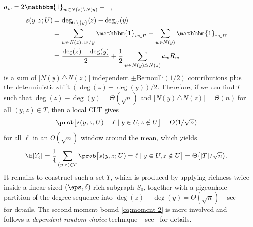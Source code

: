 $a_w = 2\mathbbm{1}_{w \in N(z) \setminus N(y)} - 1$,
\begin{align*}
  s(y, z; U)
  &= \deg_{U \setminus \{y\}}(z) - \deg_{U}(y) \\
  &= \sum_{w \in N(z),\, w \neq y} \mathbbm{1}_{w \in U} - \sum_{w \in N(y)} \mathbbm{1}_{w \in U} \\
  &= \frac{\deg(z) - \deg(y)}{2} + \frac{1}{2}\sum_{w \in N(y) \triangle N(z)} a_w R_w
\end{align*}
is a sum of $|N(y) \triangle N(z)|$ independent $\pm\mathrm{Bernoulli}(1/2)$
contributions plus the deterministic shift $(\deg(z) - \deg(y))/2$. Therefore, if we can find $T$ such that $\deg(z) - \deg(y) = \Theta(\sqrt{n})$ and $|N(y) \triangle N(z)| = \Theta(n)$ for all $(y, z) \in T$, then a local CLT gives 
\[
  \prob\bigl[s(y, z; U) = \ell \mid y \in U, z \notin U\bigr] = \Theta(1/\sqrt n)
\]
for all $\ell$ in an $O(\sqrt n)$ window around the mean, which yields
\[
  \E[Y_\ell] = \frac{1}{4}\sum_{(y, z) \in T} \prob\bigl[s(y, z; U) = \ell \mid y \in U, z \notin U\bigr] = \Theta\bigl(|T|/\sqrt n\bigr).
\]
It remains to construct such a set $T$, which is produced by applying richness twice inside a linear-sized $(\eps, \delta)$-rich subgraph $S_0$, together with a pigeonhole partition of the degree sequence into $\deg(z) - \deg(y) = \Theta(\sqrt{n})$ -- see~\cite[Lemma~13.9]{Kwan_2023} for details. The second-moment bound \eqref{eq:moment-2} is more involved and follows a \textit{dependent random choice} technique -- see~\cite[Lemmas~13.1, 13.4, 13.9]{Kwan_2023} for details.